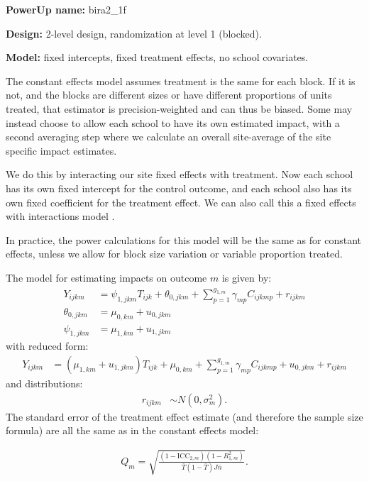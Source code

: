 \documentclass[12pt]{article}
\begin{document}
\textbf{PowerUp name:} bira2\_1f

\textbf{Design:} 2-level design, randomization at level 1 (blocked).

\textbf{Model:} fixed intercepts, fixed treatment effects, no school covariates.

The constant effects model assumes treatment is the same for each block.
If it is not, and the blocks are different sizes or have different proportions of units treated, that estimator is precision-weighted and can thus be biased.
Some may instead choose to allow each school to have its own estimated impact, with a second averaging step where we calculate an overall site-average of the site specific impact estimates.

We do this by interacting our site fixed effects with treatment.
Now each school has its own fixed intercept for the control outcome, and each school also has its own fixed coefficient for the treatment effect.
We can also call this a fixed effects with interactions model \citep{Miratrix2020}.

In practice, the power calculations for this model will be the same as for constant effects, unless we allow for block size variation or variable proportion treated.

The model for estimating impacts on outcome $m$ is given by:
\begin{align}
Y_{ijkm} &= \psi_{1,jkm} T_{ijk} + \theta_{0,jkm} + \sum_{p=1}^{g_{1,m}} \gamma_{mp} C_{ijkmp} + r_{ijkm}\\
\nonumber \theta_{0,jkm} &= \mu_{0,km} + u_{0,jkm}\\
\nonumber \psi_{1,jkm} &= \mu_{1,km} + u_{1,jkm}
\end{align}
with reduced form:
\begin{align}
Y_{ijkm} &= \left(\mu_{1,km} + u_{1,jkm}\right) T_{ijk} + \mu_{0,km} + \sum_{p=1}^{g_{1,m}} \gamma_{mp} C_{ijkmp} + u_{0,jkm} + r_{ijkm}
\end{align}
and distributions:
\begin{align}
r_{ijkm} &\sim N\left(0, \sigma^2_m\right).
\end{align}
The standard error of the treatment effect estimate (and therefore the sample size formula) are all the same as in the constant effects model:

\begin{align} Q_m = \sqrt{\frac{(1-\text{ICC}_{2,m})(1-R^2_{1,m})}{\bar{T}(1 - \bar{T}) J \bar{n}}} . \end{align}
\end{document}

